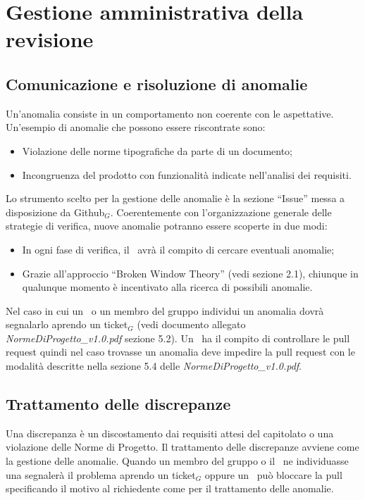 \section{Gestione amministrativa della revisione}
\subsection{Comunicazione e risoluzione di anomalie}
Un'anomalia consiste in un comportamento non coerente con le aspettative. Un'esempio di anomalie che possono essere riscontrate sono:
\begin{itemize}
	\item Violazione delle norme tipografiche da parte di un documento;
	\item Incongruenza del prodotto con funzionalità indicate nell'analisi dei requisiti.
\end{itemize}
Lo strumento scelto per la gestione delle anomalie è la sezione ``Issue'' messa a disposizione da Github$_G$. Coerentemente con l'organizzazione generale delle strategie di verifica, nuove anomalie potranno essere scoperte in due modi:

\begin{itemize}
	\item In ogni fase di verifica, il \ruoloVerificatore\ avrà il compito di cercare eventuali anomalie;
	\item Grazie all'approccio ``Broken Window Theory'' (vedi sezione 2.1), chiunque in qualunque momento è incentivato alla ricerca di possibili anomalie.
\end{itemize}
Nel caso in cui un \ruoloVerificatore\ o un membro del gruppo individui un anomalia dovrà segnalarlo aprendo un ticket$_G$ (vedi documento allegato \textit{NormeDiProgetto\_v1.0.pdf} sezione 5.2). Un \ruoloVerificatore\ ha il compito di controllare le pull request quindi nel caso trovasse un anomalia deve impedire la pull request con le modalità descritte nella sezione 5.4 delle \textit{NormeDiProgetto\_v1.0.pdf}.

\subsection{Trattamento delle discrepanze}
Una discrepanza è un discostamento dai requisiti attesi del capitolato o una violazione delle Norme di Progetto. Il trattamento delle discrepanze avviene come la gestione delle anomalie. Quando un membro del gruppo o il \ruoloVerificatore\ ne individuasse una segnalerà il problema aprendo un ticket$_G$ oppure un \ruoloVerificatore\ può bloccare la pull specificando il motivo al richiedente come per il trattamento delle anomalie.
